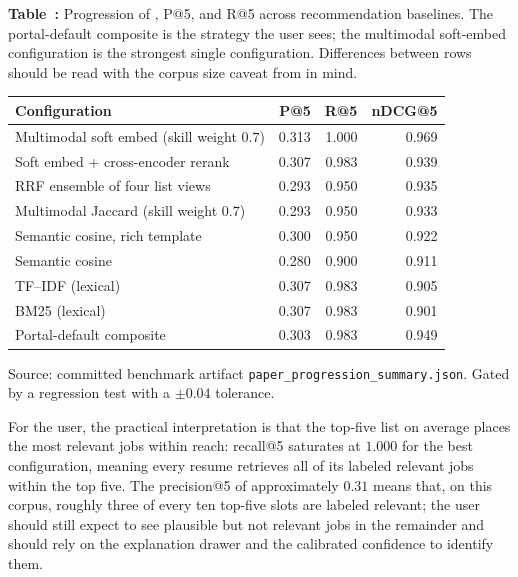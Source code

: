 \begin{center}
\label{tab:progression}
\par\smallskip\noindent\textbf{Table~\thetable:} Progression of \ndcg{}, P@5, and R@5 across recommendation baselines. The portal-default composite is the strategy the user sees; the multimodal soft-embed configuration is the strongest single configuration. Differences between rows should be read with the corpus size caveat from  in mind.
\par\smallskip
\begin{tabular}{@{}lrrr@{}}
\toprule
Configuration & P@5 & R@5 & nDCG@5 \\
\midrule
Multimodal soft embed (skill weight $0.7$)  & 0.313 & 1.000 & 0.969 \\
Soft embed + cross-encoder rerank            & 0.307 & 0.983 & 0.939 \\
RRF ensemble of four list views              & 0.293 & 0.950 & 0.935 \\
Multimodal Jaccard (skill weight $0.7$)      & 0.293 & 0.950 & 0.933 \\
Semantic cosine, rich template               & 0.300 & 0.950 & 0.922 \\
Semantic cosine                              & 0.280 & 0.900 & 0.911 \\
TF--IDF (lexical)                            & 0.307 & 0.983 & 0.905 \\
BM25 (lexical)                               & 0.307 & 0.983 & 0.901 \\
\midrule
Portal-default composite                     & 0.303 & 0.983 & 0.949 \\
\bottomrule
\end{tabular}
\par\vspace{0.4em}
\footnotesize{Source: committed benchmark artifact \texttt{paper\_progression\_summary.json}. Gated by a regression test with a $\pm 0.04$ \ndcg{} tolerance.}
\end{center}

For the user, the practical interpretation is that the top-five list on average places the most relevant jobs within reach: recall@5 saturates at $1.000$ for the best configuration, meaning every resume retrieves all of its labeled relevant jobs within the top five.
The precision@5 of approximately $0.31$ means that, on this corpus, roughly three of every ten top-five slots are labeled relevant; the user should still expect to see plausible but not relevant jobs in the remainder and should rely on the explanation drawer and the calibrated confidence to identify them.

